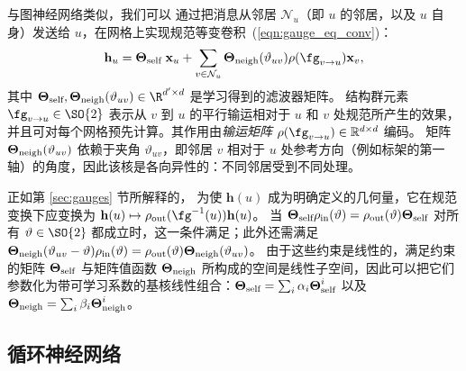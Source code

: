 与图神经网络类似，我们可以%
通过把消息从邻居 $\mathcal{N}_u$（即 $u$ 的邻居，以及 $u$ 自身）发送给 $u$，在网格上实现规范等变卷积~(\ref{eqn:gauge_eq_conv})：
\begin{equation}
    \mathbf{h}_u = \boldsymbol{\Theta}_{\textup{self}} \; \mathbf{x}_u + \sum_{v \in \mathcal{N}_u} \boldsymbol{\Theta}_{\textup{neigh}}(\vartheta_{uv}) \rho(\fg_{v \rightarrow u}) \mathbf{x}_v,
\end{equation}
其中 $\boldsymbol{\Theta}_{\textup{self}}, \boldsymbol{\Theta}_{\textup{neigh}}(\vartheta_{uv}) \in \R^{d' \times d}$ 是学习得到的滤波器矩阵。%
结构群元素 $\fg_{v \rightarrow u} \in \SO{2}$ 表示从 $v$ 到 $u$ 的平行输运相对于 $u$ 和 $v$ 处规范所产生的效果，并且可对每个网格预先计算。其作用由\emph{输运矩阵} $\rho(\fg_{v\rightarrow u})\in\mathbb{R}^{d\times d}$ 编码。
矩阵 $\boldsymbol{\Theta}_{\textup{neigh}}(\vartheta_{uv})$ 依赖于夹角 $\vartheta_{uv}$，即邻居 $v$ 相对于 $u$ 处参考方向（例如标架的第一轴）的角度，因此该核是各向异性的：不同邻居受到不同处理。

正如第 \ref{sec:gauges} 节所解释的，
为使 $\mathbf{h}(u)$ 成为明确定义的几何量，它在规范变换下应变换为 $\mathbf{h}(u) \mapsto \rho_{\textup{out}}(\fg^{-1}(u)) \mathbf{h}(u)$。
当 $\boldsymbol{\Theta}_{\textup{self}} \rho_{\textup{in}}(\vartheta) = \rho_{\textup{out}}(\vartheta) \boldsymbol{\Theta}_{\textup{self}}$ 对所有 $\vartheta \in \SO{2}$ 都成立时，这一条件满足；此外还需满足 $\boldsymbol{\Theta}_{\textup{neigh}}(\vartheta_{uv} - \vartheta) \rho_{\textup{in}}(\vartheta) = \rho_{\textup{out}}(\vartheta) \boldsymbol{\Theta}_{\textup{neigh}}(\vartheta_{uv})$。
由于这些约束是线性的，满足约束的矩阵 $\boldsymbol{\Theta}_{\textup{self}}$ 与矩阵值函数 $\boldsymbol{\Theta}_{\textup{neigh}}$ 所构成的空间是线性子空间，因此可以把它们参数化为带可学习系数的基核线性组合：$\boldsymbol{\Theta}_{\textup{self}} = \sum_i \alpha_i \boldsymbol{\Theta}_{\textup{self}}^i$ 以及
$\boldsymbol{\Theta}_{\textup{neigh}} = \sum_i \beta_i \boldsymbol{\Theta}_{\textup{neigh}}^i$。



\subsection{循环神经网络}

